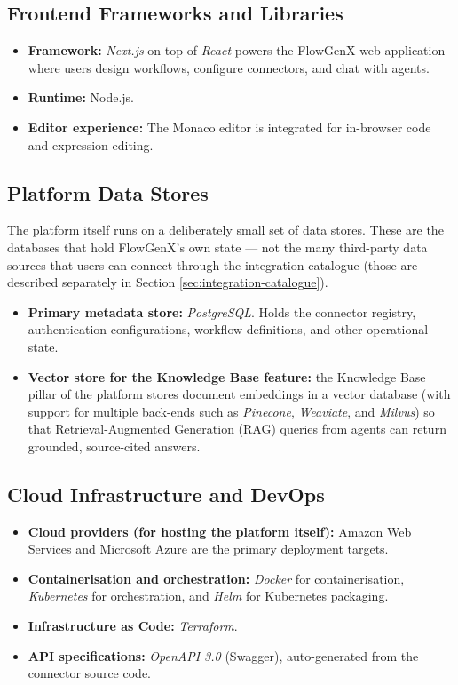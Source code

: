\subsection{Frontend Frameworks and Libraries}
\begin{itemize}[leftmargin=*]
    \item \textbf{Framework:} \emph{Next.js} on top of \emph{React}
    powers the FlowGenX web application where users design workflows, configure connectors, and chat with agents.
    \item \textbf{Runtime:} Node.js.
    \item \textbf{Editor experience:} The Monaco editor is integrated
    for in-browser code and expression editing.
\end{itemize}

\subsection{Platform Data Stores}
The platform itself runs on a deliberately small set of data stores.
These are the databases that hold FlowGenX's own state --- not the
many third-party data sources that users can connect through the
integration catalogue (those are described separately in Section
\ref{sec:integration-catalogue}).

\begin{itemize}[leftmargin=*]
    \item \textbf{Primary metadata store:} \emph{PostgreSQL}. Holds
    the connector registry, authentication configurations, workflow
    definitions, and other operational state.
    \item \textbf{Vector store for the Knowledge Base feature:} the
    Knowledge Base pillar of the platform stores document embeddings
    in a vector database (with support for multiple back-ends such as
    \emph{Pinecone}, \emph{Weaviate}, and \emph{Milvus}) so that
    Retrieval-Augmented Generation (RAG) queries from agents can
    return grounded, source-cited answers.
\end{itemize}

\subsection{Cloud Infrastructure and DevOps}
\begin{itemize}[leftmargin=*]
    \item \textbf{Cloud providers (for hosting the platform itself):}
    Amazon Web Services and Microsoft Azure are the primary
    deployment targets.
    \item \textbf{Containerisation and orchestration:} \emph{Docker}
    for containerisation, \emph{Kubernetes} for orchestration, and
    \emph{Helm} for Kubernetes packaging.
    \item \textbf{Infrastructure as Code:} \emph{Terraform}.
    \item \textbf{API specifications:} \emph{OpenAPI 3.0} (Swagger),
    auto-generated from the connector source code.
\end{itemize}

